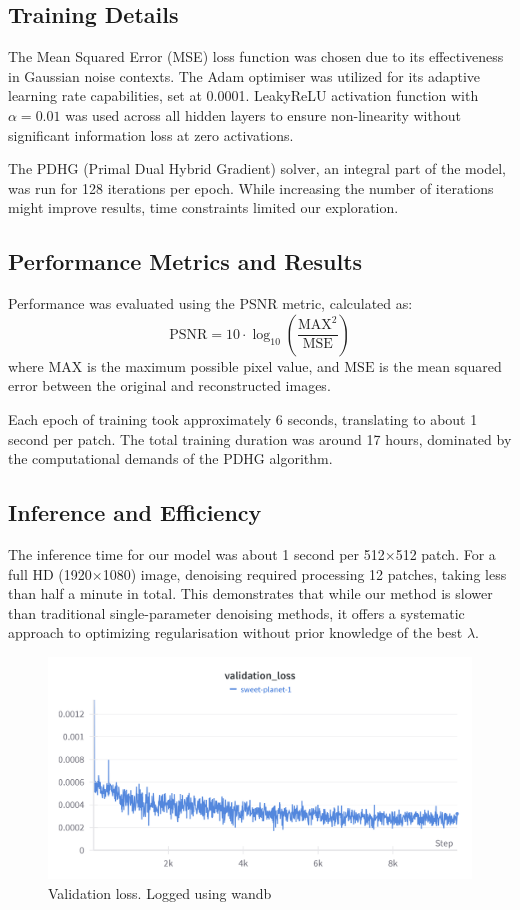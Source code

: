 \documentclass[12pt]{article}
\begin{document}
\subsection{Training Details}

The Mean Squared Error (MSE) loss function was chosen due to its effectiveness in Gaussian noise contexts. The Adam optimiser was utilized for its adaptive learning rate capabilities, set at 0.0001. LeakyReLU activation function with $\alpha = 0.01$ was used across all hidden layers to ensure non-linearity without significant information loss at zero activations. 

The PDHG (Primal Dual Hybrid Gradient) solver, an integral part of the model, was run for 128 iterations per epoch. While increasing the number of iterations might improve results, time constraints limited our exploration.

\subsection{Performance Metrics and Results}

Performance was evaluated using the PSNR metric, calculated as:
$$
\text{PSNR} = 10 \cdot \log_{10} \left( \frac{{\text{MAX}^2}}{{\text{MSE}}} \right)
$$
where $\text{MAX}$ is the maximum possible pixel value, and $\text{MSE}$ is the mean squared error between the original and reconstructed images. 

Each epoch of training took approximately 6 seconds, translating to about 1 second per patch. The total training duration was around 17 hours, dominated by the computational demands of the PDHG algorithm.

\subsection{Inference and Efficiency}

The inference time for our model was about 1 second per 512$\times$512 patch. For a full HD (1920$\times$1080) image, denoising required processing 12 patches, taking less than half a minute in total. This demonstrates that while our method is slower than traditional single-parameter denoising methods, it offers a systematic approach to optimizing regularisation without prior knowledge of the best $\lambda$.

\begin{figure}[h]
    \centering
    \includegraphics[width=0.6\linewidth, trim={0 0 0 10cm}, clip]{images/W&B Chart 5_27_2024, 5 09 06 PM.png}
    \caption{Validation loss. Logged using wandb} 
    \label{fig:training_progress}
\end{figure}
\end{document}
